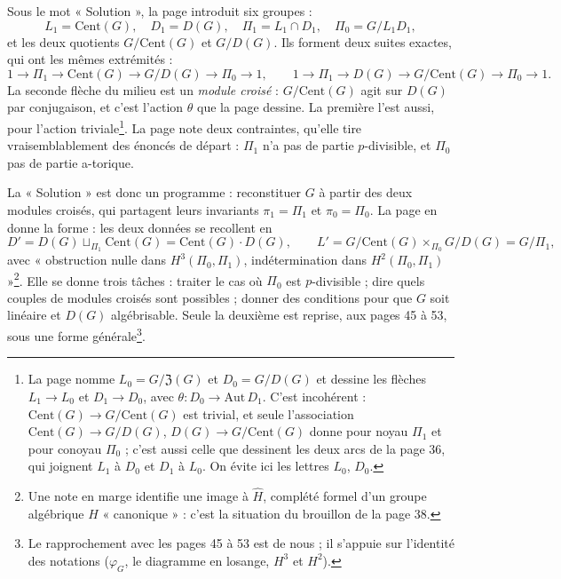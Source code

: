 \documentclass[11pt,a4paper]{article}
\begin{document}
Sous le mot « Solution », la page introduit six groupes :
\[
L_1 = \mathrm{Cent}(G), \quad D_1 = D(G), \quad
\Pi_1 = L_1 \cap D_1, \quad \Pi_0 = G / L_1 D_1,
\]
et les deux quotients $G/\mathrm{Cent}(G)$ et $G/D(G)$. Ils forment deux
suites exactes, qui ont les mêmes extrémités :
\[
1 \to \Pi_1 \to \mathrm{Cent}(G) \longrightarrow G/D(G) \to \Pi_0 \to 1,
\qquad
1 \to \Pi_1 \to D(G) \longrightarrow G/\mathrm{Cent}(G) \to \Pi_0 \to 1 .
\]
La seconde flèche du milieu est un \emph{module croisé} : $G/\mathrm{Cent}(G)$
agit sur $D(G)$ par conjugaison, et c'est l'action $\theta$ que la page
dessine. La première l'est aussi, pour l'action triviale\footnote{La page
nomme $L_0 = G/\mathfrak{Z}(G)$ et $D_0 = G/D(G)$ et dessine les flèches
$L_1 \to L_0$ et $D_1 \to D_0$, avec $\theta \colon D_0 \to \mathrm{Aut}\,D_1$.
C'est incohérent : $\mathrm{Cent}(G) \to G/\mathrm{Cent}(G)$ est trivial, et
seule l'association $\mathrm{Cent}(G) \to G/D(G)$, $D(G) \to
G/\mathrm{Cent}(G)$ donne pour noyau $\Pi_1$ et pour conoyau $\Pi_0$ ; c'est
aussi celle que dessinent les deux arcs de la page 36, qui joignent $L_1$ à
$D_0$ et $D_1$ à $L_0$. On évite ici les lettres $L_0$, $D_0$.}. La
page note deux contraintes, qu'elle tire vraisemblablement des énoncés de
départ : $\Pi_1$ n'a pas de partie $p$-divisible, et $\Pi_0$ pas de
partie a-torique.

La « Solution » est donc un programme : reconstituer $G$ à partir des deux
modules croisés, qui partagent leurs invariants $\pi_1 = \Pi_1$ et
$\pi_0 = \Pi_0$. La page en donne la forme : les deux données se recollent
en
\[
D' = D(G) \sqcup_{\Pi_1} \mathrm{Cent}(G) = \mathrm{Cent}(G) \cdot D(G),
\qquad
L' = G/\mathrm{Cent}(G) \times_{\Pi_0} G/D(G) = G/\Pi_1,
\]
avec « obstruction nulle dans $H^{3}(\Pi_0, \Pi_1)$, indétermination dans
$H^{2}(\Pi_0, \Pi_1)$ »\footnote{Une note en marge identifie une image à
$\widehat{H}$, complété formel d'un groupe algébrique $H$ « canonique » :
c'est la situation du brouillon de la page 38.}. Elle se donne trois tâches : traiter le cas où
$\Pi_0$ est $p$-divisible ; dire quels couples de modules croisés sont
possibles ; donner des conditions pour que $G$ soit linéaire et $D(G)$
algébrisable. Seule la deuxième est reprise, aux pages 45 à 53, sous une
forme générale\footnote{Le rapprochement avec les pages 45 à 53 est de
nous ; il s'appuie sur l'identité des notations ($\varphi_G$, le diagramme
en losange, $H^{3}$ et $H^{2}$).}.
\end{document}
